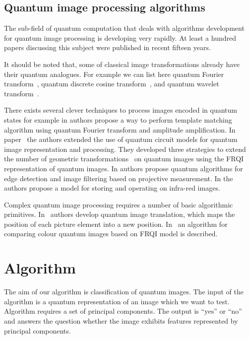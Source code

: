\documentclass[a4paper,10pt]{llncs}
\newcommand{\1}{\mathbb{1}}
\begin{document}
\subsection{Quantum image processing algorithms}
The sub-field of quantum computation that deals with algorithms development for
quantum image processing is developing very rapidly. At least a hundred papers
discussing this subject were published in recent fifteen years.

It should be noted that, some of classical image transformations already have
their quantum analogues. For example we can list here quantum Fourier
transform~\cite{nielsen2010quantum}, quantum discrete cosine
transform~\cite{klappenecker2001discrete,tseng2005quantum}, and quantum wavelet
transform~\cite{fijany1998quantum}.

There exists several clever techniques to process images encoded in quantum
states for example in \cite{curtis_towards_2004} authors propose a way to
perform template matching algorithm using quantum Fourier transform and
amplitude amplification. In paper~\cite{le2011strategies} the authors extended
the use of quantum circuit models for quantum image representation and
processing. They developed three strategies to extend the number of geometric
transformations~\cite{le2010fast} on quantum images using the FRQI
representation of quantum images. In \cite{yuan2013quantum} authors propose
quantum algorithms for edge detection and image filtering based on projective
measurement. In \cite{yuan_sqr_2014} the authors propose a model for storing and
operating on infra-red images.

Complex quantum image processing requires a number of basic algorithmic
primitives. In~\cite{wang2014image} authors develop quantum image translation,
which maps the position of each picture element into a new position.
In~\cite{zhou2014multidimensional} an algorithm for comparing colour quantum
images based on FRQI model is described.

\section{Algorithm}
The aim of our algorithm is classification of quantum images. 
The input of the algorithm is a quantum representation of an image which we want to test. Algorithm requires a set of principal components. The output is ``$\mathrm{yes}$'' or ``$\mathrm{no}$'' and answers the question whether the image exhibits features represented by principal components.
\end{document}
